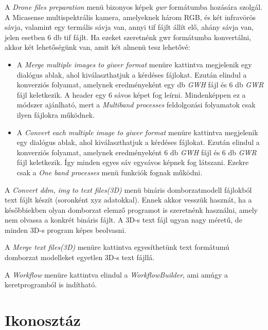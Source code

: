 \documentclass[a4paper,12pt]{book}
\begin{document}
A \textit{Drone files preparation} menü bizonyos képek \textit{gwr} formátumba hozására szolgál. A Micasense multispektrális kamera, amelyeknek három RGB, és két infravörös sávja, valamint egy termális sávja van, annyi tif fájlt állít elő, ahány sávja van, jelen esetben 6 db tif fájlt. Ha ezeket szeretnénk gwr formátumba konvertálni, akkor két lehetőségünk van, amit két almenü tesz lehetővé:
\begin{itemize}
	\item A \textit{Merge multiple images to giwer format} menüre kattintva megjelenik egy dialógus ablak, ahol kiválaszthatjuk a kérdéses fájlokat. Ezután elindul a konverziós folyamat, amelynek eredményeként egy db \textit{GWH} fájl és 6 db \textit{GWR} fájl keletkezik. A header egy 6 sávos képet fog leírni. Mindenképpen ez a módszer ajánlható, mert a \textit{Multiband processes} feldolgozási folyamatok csak ilyen fájlokra működnek.
	
	\item A \textit{Convert each multiple image to giwer format} menüre kattintva megjelenik egy dialógus ablak, ahol kiválaszthatjuk a kérdéses fájlokat. Ezután elindul a konverziós folyamat, amelynek eredményeként 6 db \textit{GWH} fájl és 6 db \textit{GWR} fájl keletkezik. Így minden egyes sáv egysávos képnek fog látszani. Ezekre csak a \textit{One band processes} menü funkciók fognak működni.
\end{itemize}

A \textit{Convert ddm, img to text files(3D)} menü bináris domborzatmodell fájlokból text fájlt készít (soronként xyz adatokkal). Ennek akkor vesszük hasznát, ha a későbbiekben olyan domborzat elemző programot is szeretnénk használni, amely nem olvassa a konkrét bináris fájlt. A 3D-s text fájl ugyan nagy méretű, de minden 3D-s program képes beolvasni.

A \textit{Merge text files(3D)} menüre kattintva egyesíthetünk text formátumú domborzat modelleket egyetlen 3D-s text fájllá.

A \textit{Workflow} menüre kattintva elindul a \textit{WorkflowBuilder}, ami amúgy a keretprogramból is indítható.

\section{Ikonosztáz}
\end{document}

